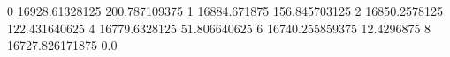 0 16928.61328125 200.787109375
1 16884.671875 156.845703125
2 16850.2578125 122.431640625
4 16779.6328125 51.806640625
6 16740.255859375 12.4296875
8 16727.826171875 0.0
